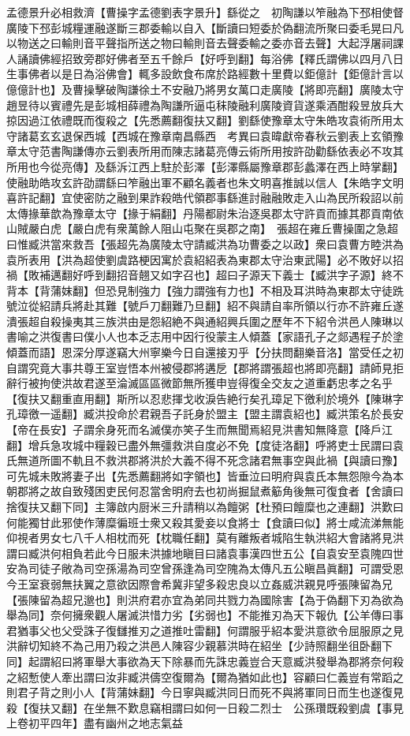 孟德景升必相救濟【曹操字孟德劉表字景升】繇從之　初陶謙以笮融為下邳相使督廣陵下邳彭城糧運融遂斷三郡委輸以自入【斷讀曰短委於偽翻流所聚曰委毛晃曰凡以物送之曰輸則音平聲指所送之物曰輸則音去聲委輸之委亦音去聲】大起浮屠祠課人誦讀佛經招致旁郡好佛者至五千餘戶【好呼到翻】每浴佛【釋氏謂佛以四月八日生事佛者以是日為浴佛會】輒多設飲食布席於路經數十里費以鉅億計【鉅億計言以億億計也】及曹操擊破陶謙徐土不安融乃將男女萬口走廣陵【將即亮翻】廣陵太守趙昱待以賓禮先是彭城相薛禮為陶謙所逼屯秣陵融利廣陵資貨遂乘酒酣殺昱放兵大掠因過江依禮既而復殺之【先悉薦翻復扶又翻】劉繇使豫章太守朱皓攻袁術所用太守諸葛玄玄退保西城【西城在豫章南昌縣西　考異曰袁暐獻帝春秋云劉表上玄領豫章太守范書陶謙傳亦云劉表所用而陳志諸葛亮傳云術所用按許劭勸繇依表必不攻其所用也今從亮傳】及繇泝江西上駐於彭澤【彭澤縣屬豫章郡彭蠡澤在西上時掌翻】使融助皓攻玄許劭謂繇曰笮融出軍不顧名義者也朱文明喜推誠以信人【朱皓字文明喜許記翻】宜使密防之融到果詐殺皓代領郡事繇進討融融敗走入山為民所殺詔以前太傳掾華歆為豫章太守【掾于絹翻】丹陽都尉朱治逐吳郡太守許貢而據其郡貢南依山賊嚴白虎【嚴白虎有衆萬餘人阻山屯聚在吳郡之南】　張超在雍丘曹操圍之急超曰惟臧洪當來救吾【張超先為廣陵太守請臧洪為功曹委之以政】衆曰袁曹方睦洪為袁所表用【洪為超使劉虞路梗因寓於袁紹紹表為東郡太守治東武陽】必不敗好以招禍【敗補邁翻好呼到翻招音翹又如字召也】超曰子源天下義士【臧洪字子源】終不背本【背蒲妺翻】但恐見制強力【強力謂強有力也】不相及耳洪時為東郡太守徒跣號泣從紹請兵將赴其難【號戶刀翻難乃旦翻】紹不與請自率所領以行亦不許雍丘遂潰張超自殺操夷其三族洪由是怨紹絶不與通紹興兵圍之歷年不下紹令洪邑人陳琳以書喻之洪復書曰僕小人也本乏志用中因行役蒙主人傾蓋【家語孔子之郯遇程子於塗傾蓋而語】恩深分厚遂竊大州寧樂今日自還接刃乎【分扶問翻樂音洛】當受任之初自謂究竟大事共尊王室豈悟本州被侵郡將遘戹【郡將謂張超也將即亮翻】請師見拒辭行被拘使洪故君遂至淪滅區區微節無所獲申豈得復全交友之道重虧忠孝之名乎【復扶又翻重直用翻】斯所以忍悲揮戈收淚告絶行矣孔璋足下徼利於境外【陳琳字孔璋徼一遥翻】臧洪投命於君親吾子託身於盟主【盟主謂袁紹也】臧洪策名於長安【帝在長安】子謂余身死而名滅僕亦笑子生而無聞焉紹見洪書知無降意【降戶江翻】增兵急攻城中糧穀已盡外無彊救洪自度必不免【度徒洛翻】呼將吏士民謂曰袁氏無道所圖不軌且不救洪郡將洪於大義不得不死念諸君無事空與此禍【與讀曰豫】可先城未敗將妻子出【先悉薦翻將如字領也】皆垂泣曰明府與袁氏本無怨隙今為本朝郡將之故自致殘困吏民何忍當舍明府去也初尚掘鼠煮䈥角後無可復食者【舍讀曰捨復扶又翻下同】主簿啟内厨米三升請稍以為饘粥【杜預曰饘糜也之連翻】洪歎曰何能獨甘此邪使作薄糜徧班士衆又殺其愛妾以食將士【食讀曰似】將士咸流涕無能仰視者男女七八千人相枕而死【枕職任翻】莫有離叛者城陷生執洪紹大會諸將見洪謂曰臧洪何相負若此今日服未洪據地瞋目曰諸袁事漢四世五公【自袁安至袁隗四世安為司徒子敞為司空孫湯為司空曾孫逢為司空隗為太傳凡五公瞋昌眞翻】可謂受恩今王室衰弱無扶翼之意欲因際會希冀非望多殺忠良以立姦威洪親見呼張陳留為兄【張陳留為超兄邈也】則洪府君亦宜為弟同共戮力為國除害【為于偽翻下刃為欲為舉為同】奈何擁衆觀人屠滅洪惜力劣【劣弱也】不能推刃為天下報仇【公羊傳曰事君猶事父也父受誅子復讎推刃之道推吐雷翻】何謂服乎紹本愛洪意欲令屈服原之見洪辭切知終不為己用乃殺之洪邑人陳容少親慕洪時在紹坐【少詩照翻坐徂卧翻下同】起謂紹曰將軍舉大事欲為天下除暴而先誅忠義豈合天意臧洪發舉為郡將奈何殺之紹慙使人牽出謂曰汝非臧洪儔空復爾為【爾為猶如此也】容顧曰仁義豈有常蹈之則君子背之則小人【背蒲妹翻】今日寧與臧洪同日而死不與將軍同日而生也遂復見殺【復扶又翻】在坐無不歎息竊相謂曰如何一日殺二烈士　公孫瓚既殺劉虞【事見上卷初平四年】盡有幽州之地志氣益